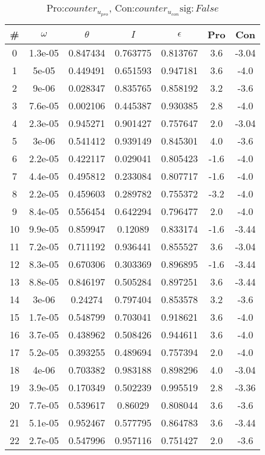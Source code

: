 \begin{table}
\caption{Pro:$counter_{u_{pro}}$, Con:$counter_{u_{con}}$$\mathrm{sig}:False$}
\begin{tabular}{c|c|c|c|c|c|c}
\# & $\omega$ & $\theta$ & $I$ & $\epsilon$ & Pro & Con\\
\hline
0 & 1.3e-05 & 0.847434 & 0.763775 & 0.813767 & 3.6 & -3.04\\
1 & 5e-05 & 0.449491 & 0.651593 & 0.947181 & 3.6 & -4.0\\
2 & 9e-06 & 0.028347 & 0.835765 & 0.858192 & 3.2 & -3.6\\
3 & 7.6e-05 & 0.002106 & 0.445387 & 0.930385 & 2.8 & -4.0\\
4 & 2.3e-05 & 0.945271 & 0.901427 & 0.757647 & 2.0 & -3.04\\
5 & 3e-06 & 0.541412 & 0.939149 & 0.845301 & 4.0 & -3.6\\
6 & 2.2e-05 & 0.422117 & 0.029041 & 0.805423 & -1.6 & -4.0\\
7 & 4.4e-05 & 0.495812 & 0.233084 & 0.807717 & -1.6 & -4.0\\
8 & 2.2e-05 & 0.459603 & 0.289782 & 0.755372 & -3.2 & -4.0\\
9 & 8.4e-05 & 0.556454 & 0.642294 & 0.796477 & 2.0 & -4.0\\
10 & 9.9e-05 & 0.859947 & 0.12089 & 0.833174 & -1.6 & -3.44\\
11 & 7.2e-05 & 0.711192 & 0.936441 & 0.855527 & 3.6 & -3.04\\
12 & 8.3e-05 & 0.670306 & 0.303369 & 0.896895 & -1.6 & -3.44\\
13 & 8.8e-05 & 0.846197 & 0.505284 & 0.897251 & 3.6 & -3.44\\
14 & 3e-06 & 0.24274 & 0.797404 & 0.853578 & 3.2 & -3.6\\
15 & 1.7e-05 & 0.548799 & 0.703041 & 0.918621 & 3.6 & -4.0\\
16 & 3.7e-05 & 0.438962 & 0.508426 & 0.944611 & 3.6 & -4.0\\
17 & 5.2e-05 & 0.393255 & 0.489694 & 0.757394 & 2.0 & -4.0\\
18 & 4e-06 & 0.703382 & 0.983188 & 0.898296 & 4.0 & -3.04\\
19 & 3.9e-05 & 0.170349 & 0.502239 & 0.995519 & 2.8 & -3.36\\
20 & 7.7e-05 & 0.539617 & 0.86029 & 0.808044 & 3.6 & -3.6\\
21 & 5.1e-05 & 0.952467 & 0.577795 & 0.864783 & 3.6 & -3.44\\
22 & 2.7e-05 & 0.547996 & 0.957116 & 0.751427 & 2.0 & -3.6\\

\end{tabular}
\end{table}
